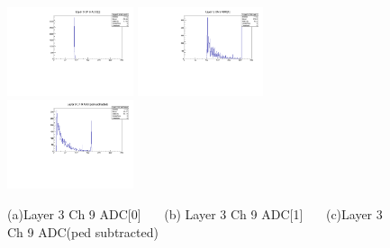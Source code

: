\documentclass[a4paper,11pt]{article}
\theoremstyle{mytheor}
\begin{document}
\begin{figure}[H] 
\vspace*{-0.3cm} 
\includegraphics[width=0.33\textwidth,scale=0.5,trim=0 0 0 0,clip]{plotsdir/file0_muons-Layer3_Ch9_adc0-1.pdf} 
\includegraphics[width=0.33\textwidth,scale=0.5,trim=0 0 0 0,clip]{plotsdir/file0_muons-Layer3_Ch9_adc1-1.pdf} 
\includegraphics[width=0.33\textwidth,scale=0.5,trim=0 0 0 0,clip]{plotsdir/file0_muons-Layer3_Ch9_adcPedsub-1.pdf} 
\caption{(a)Layer 3 Ch 9 ADC[0] ~~~(b) Layer 3 Ch 9 ADC[1] ~~~(c)Layer 3 Ch 9 ADC(ped subtracted) } 
\end{figure} 
\newpage 
\end{document}
